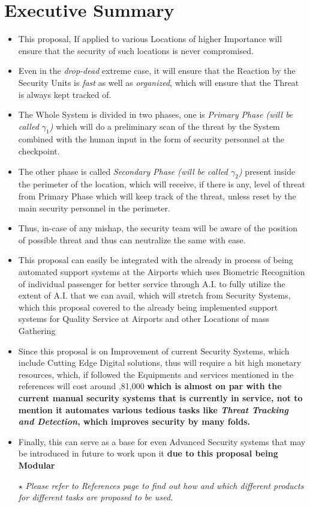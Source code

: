 \documentclass[a4paper,11pt]{article}
\begin{document}
\section{Executive Summary}
\begin{itemize}
\item{This proposal, If applied to various Locations of higher Importance will ensure that the security of such locations is never compromised.}
\item{Even in the \textit{drop-dead} extreme case, it will ensure that the Reaction by the Security Units is \textit{fast} as well as \textit{organized}, which will ensure that the Threat is always kept tracked of.}
\item{The Whole System is divided in two phases, one is \textit{Primary Phase (will be called $\gamma_1$) } which will do a preliminary scan of the threat by the System combined with the human input in the form of security personnel at the checkpoint.}
\item{The other phase is called \textit{Secondary Phase (will be called $\gamma_2$)} present inside the perimeter of the location, which will receive, if there is any, level of threat from Primary Phase which will keep track of the threat, unless reset by the main security personnel in the perimeter.}
\item{Thus, in-case of any mishap, the security team will be aware of the position of possible threat and thus can neutralize the same with ease.}
\item{This proposal can easily be integrated with the already in process of being automated support systems at the Airports which uses Biometric Recognition of individual passenger for better service through A.I. to fully utilize the extent of A.I. that we can avail, which will stretch from Security Systems, which this proposal covered to the already being implemented support systems for Quality Service at Airports and other Locations of mass Gathering \textbf{\cite{AI Already}}}
\item{Since this proposal is on Improvement of current Security Systems, which include Cutting Edge Digital solutions, thus will require a bit high monetary resources, which, if followed the Equipments and services mentioned in the references will cost around ,81,000 \textbf{which is almost on par with the current manual security systems that is currently in service, not to mention it automates various tedious tasks like \textit{Threat Tracking and Detection}, which improves security by many folds.}}
\item{Finally, this can serve as a base for even Advanced Security systems that may be introduced in future to work upon it \textbf{due to this proposal being Modular}}
\item[$\star$]{\textit{Please refer to References page to find out how and which different products for different tasks are \textit{proposed} to be used.}}
\end{itemize}
\end{document}
